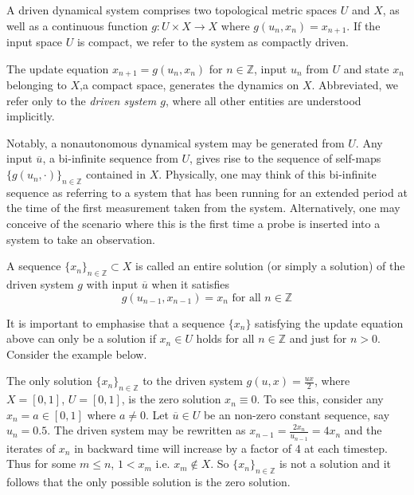 \begin{Definition}
  \label{Dfn_DDS} \rm
A driven dynamical system comprises two topological metric spaces $U$ and $X$, as well as  a continuous function  ${g:U\times{X}\to{X}}$ where ${g(u_n, x_n)=x_{n+1}}$.
If the input space $U$ is compact, we refer to the system as compactly driven. 
\end{Definition}

The update equation $x_{n+1} = g(u_n,x_n)$ for $n \in\mathbb{Z}$, input $u_n$ from $U$ and state $x_n$ belonging to $X$,a compact space, generates the dynamics on $X$. 
Abbreviated, we refer only to the \textit{driven system $g$}, where all other entities are understood implicitly.

Notably, a nonautonomous dynamical system may be generated from $U$. Any input $\overline{u}$, a bi-infinite sequence from $U$, gives rise to the sequence of self-maps ${\{g(u_n, \cdot)\}}_{n\in\mathbb{Z}}$ contained in $X$.
Physically, one may think of this bi-infinite sequence as referring to a system that has been running for an extended period at the time of the first measurement taken from the system. Alternatively, one may conceive of the scenario where this is the first time a probe is inserted into a system to take an observation.

\begin{Definition}
  \label{Dfn_Soln} \rm
  A sequence ${\{x_n\}}_{n\in\mathbb{Z}}\subset X$ is called an entire solution (or simply a solution) of the driven system  $g$ with input $\overline{u}$ when it satisfies 
  \begin{equation}
    g(u_{n-1}, x_{n-1})=x_n \text{ for all }n\in\mathbb{Z}
  \end{equation}
  
\end{Definition}

It is important to emphasise that a sequence $\{x_n\}$ satisfying the update equation above can only be a solution if $x_n\in{U}$ holds for all $n\in\mathbb{Z}$ and just for $n>0$. Consider the example below.

\begin{Example}\label{ex_halfux}\rm
  The only solution  ${\{x_n\}}_{n\in\mathbb{Z}}$ to the driven system  $g(u,x)=\frac{ux}{2}$, where $X=[0,1]$, $U=[0,1]$,  is the zero solution $x_n\equiv0$.
  To see this, consider any $x_n=a\in[0,1]$ where $a\neq{0}$.  Let $\overline{u}\in{U}$ be an non-zero constant sequence, say $u_n=0.5$. 
  The driven system may be rewritten as $x_{n-1}=\frac{2x_n}{u_{n-1}}=4x_n$ and the  iterates of $x_n$ in backward time will increase by a factor of 4 at each timestep. 
  Thus for some $m\leq{n}$,  $1<x_m$ i.e. $x_m\notin{X}$. So ${\{x_n\}}_{n\in\mathbb{Z}}$ is not a solution and it follows that the only possible solution is the zero solution.
\end{Example}


